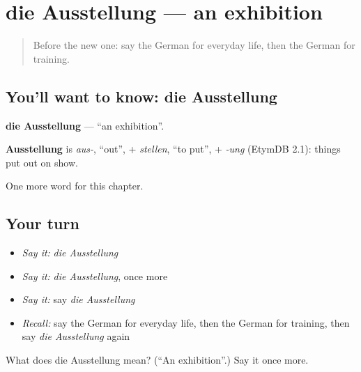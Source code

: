 \section[die Ausstellung]{die Ausstellung — an exhibition}

\label{lesson:GE-C225-ausstellung}



\begin{quote}
Before the new one: say the German for everyday life, then the German for training.
\end{quote}

\subsection*{You'll want to know: die Ausstellung}
\textbf{die Ausstellung} — \textquotedblleft{}an exhibition\textquotedblright{}.

\begin{cousinweb}
\textbf{Ausstellung} is \emph{aus-}, \textquotedblleft{}out\textquotedblright{}, + \emph{stellen}, \textquotedblleft{}to put\textquotedblright{}, + \emph{-ung} (EtymDB 2.1): things put out on show.
\end{cousinweb}

\begin{grammarlens}[title={What you've built}]
One more word for this chapter.
\end{grammarlens}

\subsection*{Your turn}
\begin{itemize}
\raggedright
  \item \emph{Say it:} \emph{die Ausstellung}
  \item \emph{Say it:} \emph{die Ausstellung}, once more
  \item \emph{Say it:} say \emph{die Ausstellung}
  \item \emph{Recall:} say the German for everyday life, then the German for training, then say \emph{die Ausstellung} again
\end{itemize}

\begin{tcolorbox}[breakable,colback=teal!4,colframe=teal!35!black,title={Before you move on}]
What does die Ausstellung mean? (\textquotedblleft{}An exhibition\textquotedblright{}.) Say it once more.
\end{tcolorbox}
